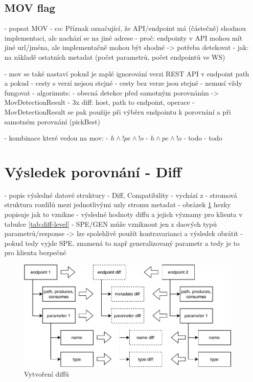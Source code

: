 \documentclass[czech,DP]{thesiskiv}
\begin{document}
\subsection{MOV flag}	

- popsat MOV
- co: Příznak označující, že API/endpoint má (částečně) shodnou implementaci, ale nachází se na jiné adrese
- proč: endpointy v API mohou mít jiné url/jména, ale implementačně mohou být shodné -> potřeba detekovat
- jak: na základě ostatních metadat (počet parametrů, počet endpointů ve WS)

- mov se také nastaví pokud je zaplé ignorování verzi REST API v endpoint path a pokud 
	- cesty s verzí nejsou stejné
	- cesty bez verze jsou stejné
- nemusí vždy fungovat
- algorimuts:
	- obecná detekce před samotným porovnáním -> MovDetectionResult
		- 3x diff: host, path to endpoint, operace
	- MovDetectionResult se pak použije při výběru endpointu k porovnání a při samotném porovnání (pickBest)
	
- kombinace které vedou na mov: 
	- $h \land !pe \land !o$
	- $h \land pe \land !o$
	- todo
	- todo
	
	
\section{Výsledek porovnání - Diff}	
- popis výsledné datové struktury
	- Diff, Compatibility
	- vychází z \cite{brada2006diff}
	- stromová struktura rozdílů mezi jednotlivými uzly stromu metadat
	- obrázek \ref{fig:diff-construction} hezky popisuje jak to vznikne
	- výsledné hodnoty diffu a jejich významy pro klienta v tabulce \ref{tab:diff-level}
		- SPE/GEN může vzniknout jen z daových typů parametrů/response -> lze spolehlivě použít kontravarianci a výsledek obrátit
		- pokud tedy vyjde SPE, znamená to např generalizovaný parametr a tedy je to pro klienta bezpečné
	
\begin{figure}[h]
	\centering
	\includegraphics{diff-construction}
	\caption{Vytvoření diffů}
	\label{fig:diff-construction}
\end{figure}
\end{document}
